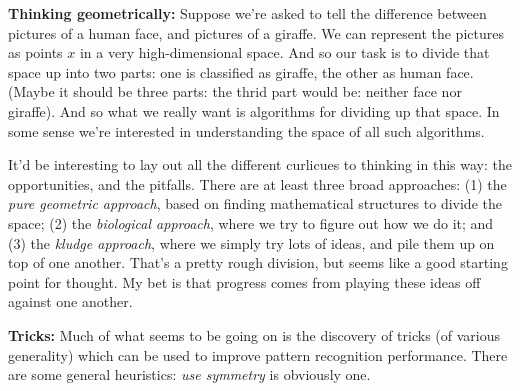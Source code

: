 \documentclass[12pt]{report}
\begin{document}
\textbf{Thinking geometrically:} Suppose we're asked to tell the
difference between pictures of a human face, and pictures of a
giraffe.  We can represent the pictures as points $x$ in a very
high-dimensional space.  And so our task is to divide that space up
into two parts: one is classified as giraffe, the other as human face.
(Maybe it should be three parts: the thrid part would be: neither face
nor giraffe).  And so what we really want is algorithms for dividing
up that space.  In some sense we're interested in understanding the
space of all such algorithms. 

It'd be interesting to lay out all the different curlicues to thinking
in this way: the opportunities, and the pitfalls.  There are at least
three broad approaches: (1) the \emph{pure geometric approach}, based
on finding mathematical structures to divide the space; (2) the
\emph{biological approach}, where we try to figure out how we do it;
and (3) the \emph{kludge approach}, where we simply try lots of ideas,
and pile them up on top of one another.  That's a pretty rough
division, but seems like a good starting point for thought.  My bet is
that progress comes from playing these ideas off against one another.

\textbf{Tricks:} Much of what seems to be going on is the discovery of
tricks (of various generality) which can be used to improve pattern
recognition performance.  There are some general heuristics: \emph{use
  symmetry} is obviously one.
\end{document}
